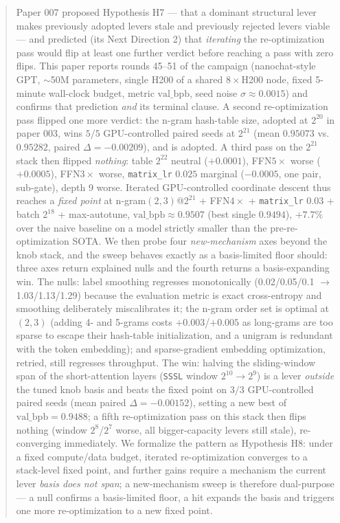 \documentclass{article}
\newcommand{\valbpb}{\mathrm{val\_bpb}}
\begin{document}
\begin{abstract}
Paper 007 proposed Hypothesis H7 --- that a dominant structural lever makes previously adopted levers stale and previously rejected levers viable --- and predicted (its Next Direction 2) that \emph{iterating} the re-optimization pass would flip at least one further verdict before reaching a pass with zero flips. This paper reports rounds 45--51 of the campaign (nanochat-style GPT, $\sim$50M parameters, single H200 of a shared $8\times$H200 node, fixed 5-minute wall-clock budget, metric $\valbpb$, seed noise $\sigma \approx 0.0015$) and confirms that prediction \emph{and} its terminal clause. A second re-optimization pass flipped one more verdict: the n-gram hash-table size, adopted at $2^{20}$ in paper 003, wins $5/5$ GPU-controlled paired seeds at $2^{21}$ (mean $0.95073$ vs.\ $0.95282$, paired $\Delta = -0.00209$), and is adopted. A third pass on the $2^{21}$ stack then flipped \emph{nothing}: table $2^{22}$ neutral ($+0.0001$), FFN$5\times$ worse ($+0.0005$), FFN$3\times$ worse, \texttt{matrix\_lr} $0.025$ marginal ($-0.0005$, one pair, sub-gate), depth 9 worse. Iterated GPU-controlled coordinate descent thus reaches a \emph{fixed point} at n-gram$(2,3)$@$2^{21}$ + FFN$4\times$ + \texttt{matrix\_lr} $0.03$ + batch $2^{18}$ + max-autotune, $\valbpb \approx 0.9507$ (best single $0.9494$), $+7.7\%$ over the naive baseline on a model strictly smaller than the pre-re-optimization SOTA. We then probe four \emph{new-mechanism} axes beyond the knob stack, and the sweep behaves exactly as a basis-limited floor should: three axes return explained nulls and the fourth returns a basis-expanding win. The nulls: label smoothing regresses monotonically (0.02/0.05/0.1 $\rightarrow$ 1.03/1.13/1.29) because the evaluation metric is exact cross-entropy and smoothing deliberately miscalibrates it; the n-gram order set is optimal at $(2,3)$ (adding 4- and 5-grams costs $+0.003$/$+0.005$ as long-grams are too sparse to escape their hash-table initialization, and a unigram is redundant with the token embedding); and sparse-gradient embedding optimization, retried, still regresses throughput. The win: halving the sliding-window span of the short-attention layers (\texttt{SSSL} window $2^{10}\rightarrow 2^{9}$) is a lever \emph{outside} the tuned knob basis and beats the fixed point on $3/3$ GPU-controlled paired seeds (mean paired $\Delta = -0.00152$), setting a new best of $\valbpb = 0.9488$; a fifth re-optimization pass on this stack then flips nothing (window $2^{8}$/$2^{7}$ worse, all bigger-capacity levers still stale), re-converging immediately. We formalize the pattern as Hypothesis H8: under a fixed compute/data budget, iterated re-optimization converges to a stack-level fixed point, and further gains require a mechanism the current lever \emph{basis does not span}; a new-mechanism sweep is therefore dual-purpose --- a null confirms a basis-limited floor, a hit expands the basis and triggers one more re-optimization to a new fixed point.
\end{abstract}
\end{document}
